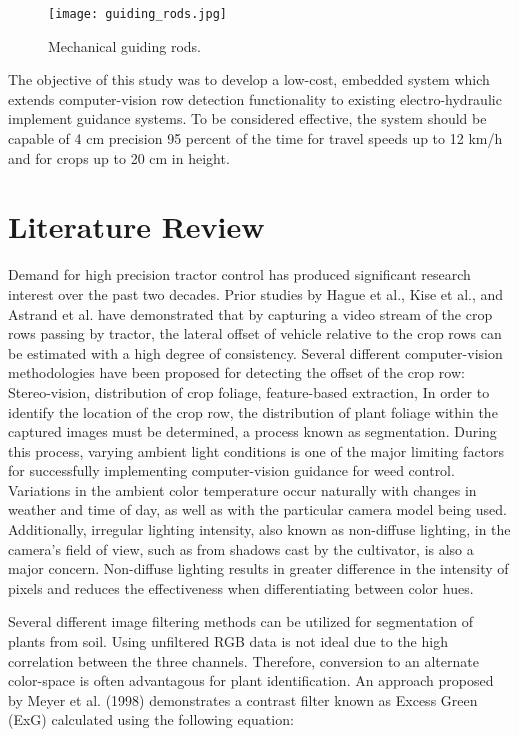 \begin{figure}
  \centering
  \texttt{[image: guiding\_rods.jpg]}
  \caption{Mechanical guiding rods.}
  \label{fig:guiding_rods}
\end{figure}

The objective of this study was to develop a low-cost, embedded system
which extends computer-vision row detection functionality to existing
electro-hydraulic implement guidance systems.  To be considered
effective, the system should be capable of 4 cm precision 95 percent of the 
time for travel speeds up to 12 km/h and for crops up to 20 cm in
height.

\section{Literature Review}
Demand for high precision tractor control has produced significant
research interest over the past two decades. Prior studies by Hague et
al., Kise et al., and Astrand et al. have demonstrated that by 
capturing a video stream of the crop rows passing by tractor, the 
lateral offset of vehicle relative to the crop rows can be estimated
with a high degree of consistency. Several different computer-vision
methodologies have been proposed for detecting the offset of the crop
row: Stereo-vision, distribution of crop foliage, feature-based extraction, 
In order to identify the location of the crop row, the distribution of
plant foliage within the captured images must be determined, a process
known as segmentation. During this process, varying ambient light
conditions is one of the major limiting factors for successfully
implementing computer-vision guidance for weed control. Variations in
the ambient color temperature occur naturally with changes in weather
and time of day, as well as with the particular camera model being
used. Additionally, irregular lighting intensity, also known as
non-diffuse lighting, in the camera’s field of view, such as from
shadows cast by the cultivator, is also a major concern. Non-diffuse
lighting results in greater difference in the intensity of pixels and
reduces the effectiveness when differentiating between color hues.
 
Several different image filtering methods can be utilized for
segmentation of plants from soil. Using unfiltered RGB data is not
ideal due to the high correlation between the three
channels. Therefore, conversion to an alternate color-space is often
advantagous for plant identification. An approach proposed by Meyer et
al. (1998) demonstrates a contrast filter known as Excess Green (ExG)
calculated using the following equation:

